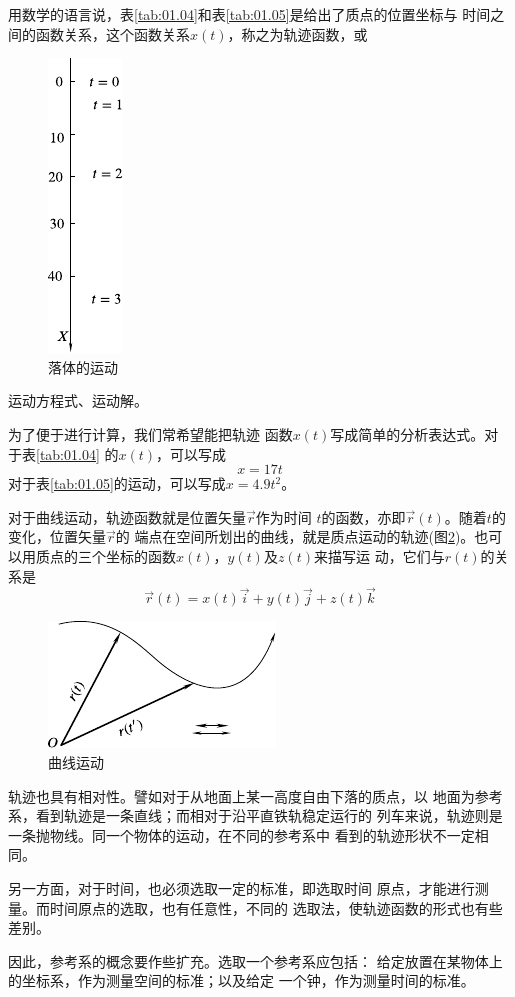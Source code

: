 用数学的语言说，表\ref{tab:01.04}和表\ref{tab:01.05}是给出了质点的位置坐标与
时间之间的函数关系，这个函数关系$x\left(t\right)$，称之为轨迹函数，或
\begin{figure}
  \centering
  \includegraphics{figure/fig01.08}
  \caption{落体的运动}
  \label{fig:01.08}
\end{figure}
运动方程式、运动解。

为了便于进行计算，我们常希望能把轨迹
函数$x\left(t\right)$写成简单的分析表达式。对于表\ref{tab:01.04}
的$x\left(t\right)$，可以写成
\begin{equation}\label{eqn:01.05.01}
  x=17t
\end{equation}
对于表\ref{tab:01.05}的运动，可以写成$x=4.9t^2$。

对于曲线运动，轨迹函数就是位置矢量$\vec{r}$作为时间
$t$的函数，亦即$\vec{r}\left(t\right)$。随着$t$的变化，位置矢量$\vec{r}$的
端点在空间所划出的曲线，就是质点运动的轨迹(图\ref{fig:01.09})。也可
以用质点的三个坐标的函数$x\left(t\right)$，$y\left(t\right)$及$z\left(t\right)$来描写运
动，它们与$r\left(t\right)$的关系是
\clearpage
\begin{equation}\label{eqn:01.05.02}
  \vec{r}\left(t\right)=x\left(t\right)\vec{i}+y\left(t\right)\vec{j}+z\left(t\right)\vec{k}
\end{equation}

\begin{figure}
  \centering
  \includegraphics{figure/fig01.09}
  \caption{曲线运动}
  \label{fig:01.09}
\end{figure}
轨迹也具有相对性。譬如对于从地面上某一高度自由下落的质点，以
地面为参考系，看到轨迹是一条直线；而相对于沿平直铁轨稳定运行的
列车来说，轨迹则是一条抛物线。同一个物体的运动，在不同的参考系中
看到的轨迹形状不一定相同。

另一方面，对于时间，也必须选取一定的标准，即选取时间
原点，才能进行测量。而时间原点的选取，也有任意性，不同的
选取法，使轨迹函数的形式也有些差别。

因此，参考系的概念要作些扩充。选取一个参考系应包括：
给定放置在某物体上的坐标系，作为测量空间的标准；以及给定
一个钟，作为测量时间的标准。
